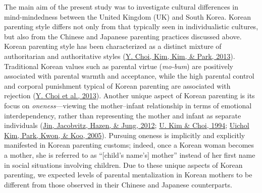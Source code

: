 \documentclass[
]{article}
\begin{document}
The main aim of the present study was to investigate cultural differences in mind-mindedness between the United Kingdom (UK) and South Korea. Korean parenting style differs not only from that typically seen in individualistic cultures, but also from the Chinese and Japanese parenting practices discussed above. Korean parenting style has been characterized as a distinct mixture of authoritarian and authoritative styles (\protect\hyperlink{ref-Choi2013}{Y. Choi, Kim, Kim, \& Park, 2013}). Traditional Korean values such as parental virtue (\emph{mo-bum}) are positively associated with parental warmth and acceptance, while the high parental control and corporal punishment typical of Korean parenting are associated with rejection (\protect\hyperlink{ref-Choi2013}{Y. Choi et al., 2013}). Another unique aspect of Korean parenting is its focus on \emph{oneness}---viewing the mother--infant relationship in terms of emotional interdependency, rather than representing the mother and infant as separate individuals (\protect\hyperlink{ref-Jin2012}{Jin, Jacobvitz, Hazen, \& Jung, 2012}; \protect\hyperlink{ref-Kim1994}{U. Kim \& Choi, 1994}; \protect\hyperlink{ref-Kim2005}{Uichol Kim, Park, Kwon, \& Koo, 2005}). Pursuing oneness is implicitly and explicitly manifested in Korean parenting customs; indeed, once a Korean woman becomes a mother, she is referred to as ``{[}child's name's{]} mother'' instead of her first name in social situations involving children. Due to these unique aspects of Korean parenting, we expected levels of parental mentalization in Korean mothers to be different from those observed in their Chinese and Japanese counterparts.
\end{document}
